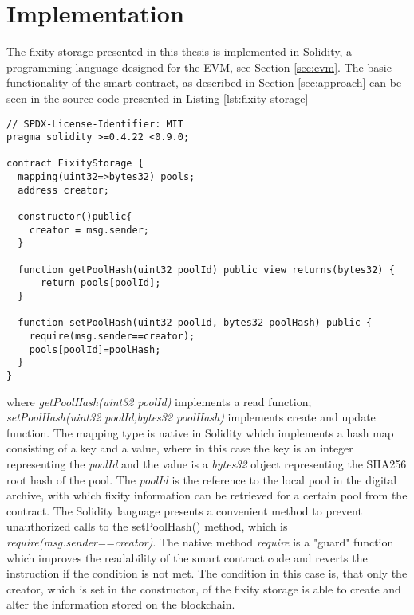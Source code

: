 \section{Implementation}
\label{sec:implementation}
The fixity storage presented in this thesis is implemented in Solidity, a programming language designed for the EVM, see Section \ref{sec:evm}.
The basic functionality of the smart contract, as described in Section \ref{sec:approach} can be seen in the source code presented in Listing \ref{lst:fixity-storage}
\begin{lstlisting}[language=Solidity,caption={MVP source code of the fixity storage deployed on the Ropsten test network \url{https://Ropsten.etherscan.io/address/0x0243c7aa552730E8C6F7ED25A480a7C0c88a70f0}},label=lst:fixity-storage]
// SPDX-License-Identifier: MIT
pragma solidity >=0.4.22 <0.9.0;

contract FixityStorage {
  mapping(uint32=>bytes32) pools;
  address creator;

  constructor()public{
    creator = msg.sender;
  }

  function getPoolHash(uint32 poolId) public view returns(bytes32) {
      return pools[poolId];
  }

  function setPoolHash(uint32 poolId, bytes32 poolHash) public {
    require(msg.sender==creator);
    pools[poolId]=poolHash;
  }
}
\end{lstlisting}
where \textit{getPoolHash(uint32 poolId)} implements a read function; \textit{setPoolHash(uint32 poolId,bytes32 poolHash)} implements create and update function. The mapping type is native in Solidity which implements a hash map consisting of a key and a value, where in this case the key is an integer representing the \textit{poolId} and the value is a \textit{bytes32} object representing the SHA256 root hash of the pool. The \textit{poolId} is the reference to the local pool in the digital archive, with which fixity information can be retrieved for a certain pool from the contract. The Solidity language presents a convenient  method to prevent unauthorized calls to the setPoolHash() method, which is \textit{require(msg.sender==creator)}. The native method \textit{require} is a "guard" function which improves the readability of the smart contract code and reverts the instruction if the condition is not met. The condition in this case is, that only the creator, which is set in the constructor, of the fixity storage is able to create and alter the information stored on the blockchain.

